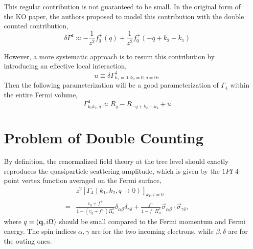 \documentclass[reprint,amsmath,amssymb,aps,prb]{revtex4-1}
\begin{document}
This regular contribution is not guaranteed to be small. In the original form of the KO paper,
the authors proposed to model this contribution with the double counted contribution,
\begin{equation}
    \delta \Gamma^4 \approx -\frac{1}{z^2}f_0^+(q)+\frac{1}{z^2}f_0^+(-q+k_2-k_1)
\end{equation}

However, a more systematic approach is to resum this contribution by introducing an effective local interaction,
\begin{equation}
    u \equiv \delta \Gamma^4_{k_1=0, k_2=0; q=0},
\end{equation}
Then the following parameterization will be a good parameterization of $\Gamma_4$ within the entire Fermi volume,
\begin{equation}
    \Gamma^4_{k_1k_2;q} \approx R_q-R_{-q+k_2-k_1}+u
\end{equation}


\section{Problem of Double Counting}

By definition, the renormalized field theory at the tree level should exactly reproduces the quasiparticle scattering amplitude, which is given by the $1PI$ $4$-point vertex function averaged on the Fermi surface,
\begin{align*}
      & z^2 \left[\Gamma_4(k_1, k_2, q\rightarrow 0)\right]_{k_F, l=0}                                                                                                     \\
    = & \frac{v_q+f^+}{1-(v_q+f^+) \Pi_0^*}\delta_{\alpha\beta}\delta_{\gamma\delta}+\frac{f^-}{1-f^- \Pi_0^*}\vec{\sigma}_{\alpha\beta}\cdot \vec{\sigma}_{\gamma\delta},
\end{align*}
where $q=(\mathbf{q}, i\Omega)$ should be small compared to the Fermi momentum and Fermi energy. The spin indices $\alpha, \gamma$ are for the two incoming electrons, while $\beta, \delta$ are for the outing ones.
\end{document}
